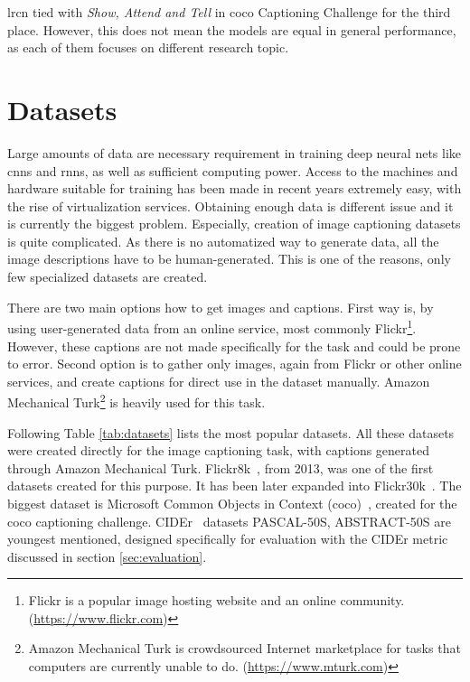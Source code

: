 \gls{lrcn} tied with \emph{Show, Attend and Tell} in \gls{coco} Captioning Challenge for the third place. However, this does not mean the models are equal in general performance, as each of them focuses on different research topic.

\section{Datasets}\label{sec:datasets}

Large amounts of data are necessary requirement in training deep neural nets like  \gls{cnn}s and \gls{rnn}s, as well as sufficient computing power. Access to the machines and hardware suitable for training has been made in recent years extremely easy, with the rise of virtualization services. Obtaining enough data is different issue and it is currently the biggest problem. Especially, creation of image captioning datasets is quite complicated. As there is no automatized way to generate data, all the image descriptions have to be human-generated. This is one of the reasons, only few specialized datasets are created.

There are two main options how to get images and captions. First way is, by using user-generated data from an online service, most commonly Flickr\footnote{Flickr is a popular image hosting website and an online community. (\url{https://www.flickr.com})}. However, these captions are not made specifically for the task and could be prone to error. Second option is to gather only images, again from Flickr or other online services, and create captions for direct use in the dataset manually. Amazon Mechanical Turk\footnote{Amazon Mechanical Turk is crowdsourced Internet marketplace for tasks that computers are currently unable to do. (\url{https://www.mturk.com})} is heavily used for this task.

Following Table \ref{tab:datasets} lists the most popular datasets. All these datasets were created directly for the image captioning task, with captions generated through Amazon Mechanical Turk. Flickr8k~\cite{dataset-flickr8k}, from 2013, was one of the first datasets created for this purpose. It has been later expanded into Flickr30k~\cite{dataset-flickr30k}. The biggest dataset is Microsoft Common Objects in Context (\gls{coco})~\cite{DBLP:journals/corr/ChenFLVGDZ15}, created for the \gls{coco} captioning challenge. CIDEr~\cite{Vedantam_2015_CVPR} datasets PASCAL-50S, ABSTRACT-50S are youngest mentioned, designed specifically for evaluation with the CIDEr metric discussed in section \ref{sec:evaluation}.

